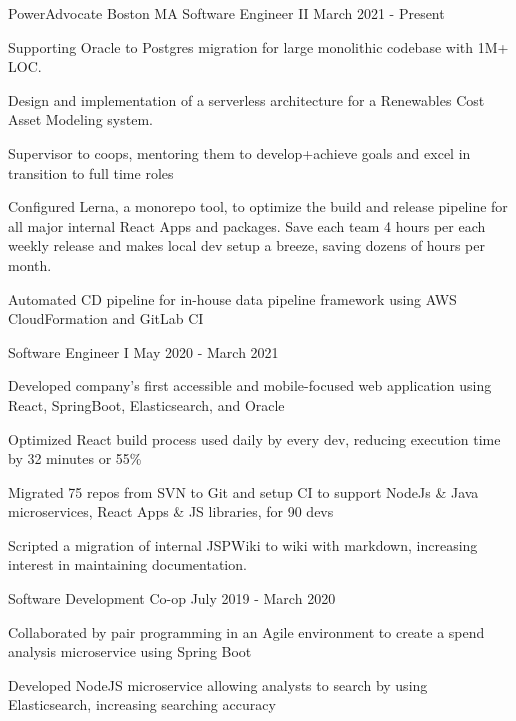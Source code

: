 
\begin{cventries}
\cventrythreepositions
    {PowerAdvocate}
    {Boston MA}
    {Software Engineer II} %
    {March 2021 - Present} %
    {
        \begin{cvitems} %
            \item {Supporting Oracle to Postgres migration for large monolithic codebase with 1M+ LOC.}
            \item {Design and implementation of a serverless architecture for a Renewables Cost Asset Modeling system.}
            \item {Supervisor to coops, mentoring them to develop+achieve goals and excel in transition to full time roles}
            \item {Configured Lerna, a monorepo tool, to optimize the build and release pipeline for all major internal React Apps and packages. Save each team 4 hours per each weekly release and makes local dev setup a breeze, saving dozens of hours per month.}
            \item {Automated CD pipeline for in-house data pipeline framework using AWS CloudFormation and GitLab CI}
        \end{cvitems}
    }
    {Software Engineer I}
    {May 2020 - March 2021}
    {
      \begin{cvitems} %
        \item {Developed company's first accessible and mobile-focused web application using React, SpringBoot, Elasticsearch, and Oracle}
        \item {Optimized React build process used daily by every dev, reducing execution time by 32 minutes or 55\%}
        \item {Migrated 75 repos from SVN to Git and setup CI to support NodeJs \& Java microservices, React Apps \& JS libraries, for 90 devs}
        \item {Scripted a migration of internal JSPWiki to wiki with markdown, increasing interest in maintaining documentation.}
      \end{cvitems}
    }
    {Software Development Co-op}
    {July 2019 - March 2020}
    {
      \begin{cvitems} %
        \item {Collaborated by pair programming in an Agile environment to create a spend analysis microservice using Spring Boot}
        \item {Developed NodeJS microservice allowing analysts to search by using Elasticsearch, increasing searching accuracy}
      \end{cvitems}
    }


\end{cventries}
